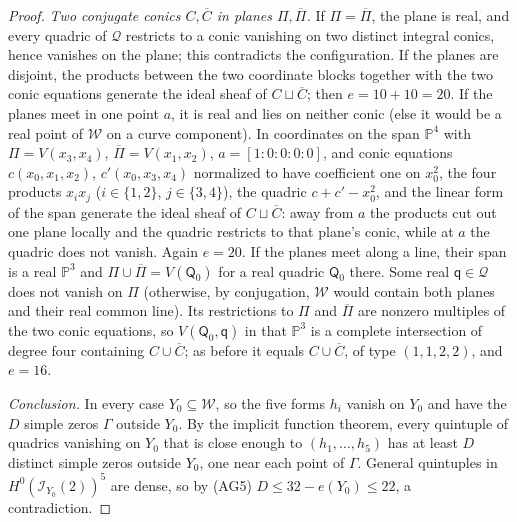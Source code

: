 \begin{proof}
\emph{Two conjugate conics $C,\overline C$ in planes $\Pi,\overline\Pi$.} If
$\Pi=\overline\Pi$, the plane is real, and every quadric of $\mathcal Q$
restricts to a conic vanishing on two distinct integral conics, hence vanishes
on the plane; this contradicts the configuration. If the planes are disjoint,
the products between the two coordinate blocks together with the two conic
equations generate the ideal sheaf of $C\sqcup\overline C$; then
$e=10+10=20$. If the planes meet in one point $a$, it is real and lies on
neither conic (else it would be a real point of $\mathcal W$ on a curve
component). In coordinates on the span $\mathbb P^4$ with $\Pi=V(x_3,x_4)$,
$\overline\Pi=V(x_1,x_2)$, $a=[1:0:0:0:0]$, and conic equations
$c(x_0,x_1,x_2)$, $c'(x_0,x_3,x_4)$ normalized to have coefficient one on
$x_0^2$, the four products $x_ix_j$ ($i\in\{1,2\}$, $j\in\{3,4\}$), the
quadric $c+c'-x_0^2$, and the linear form of the span generate the ideal sheaf
of $C\sqcup\overline C$: away from $a$ the products cut out one plane locally
and the quadric restricts to that plane's conic, while at $a$ the quadric
does not vanish. Again $e=20$. If the planes meet along a line, their span is
a real $\mathbb P^3$ and $\Pi\cup\overline\Pi=V(\mathsf Q_0)$ for a real
quadric $\mathsf Q_0$ there. Some real $\mathsf q\in\mathcal Q$ does not
vanish on $\Pi$ (otherwise, by conjugation, $\mathcal W$ would contain both
planes and their real common line). Its restrictions to $\Pi$ and
$\overline\Pi$ are nonzero multiples of the two conic equations, so
$V(\mathsf Q_0,\mathsf q)$ in that $\mathbb P^3$ is a complete intersection of
degree four containing $C\cup\overline C$; as before it equals
$C\cup\overline C$, of type $(1,1,2,2)$, and $e=16$.

\emph{Conclusion.} In every case $Y_0\subseteq\mathcal W$, so the five forms
$h_i$ vanish on $Y_0$ and have the $D$ simple zeros $\Gamma$ outside $Y_0$. By
the implicit function theorem, every quintuple of quadrics vanishing on $Y_0$
that is close enough to $(h_1,\ldots,h_5)$ has at least $D$ distinct simple
zeros outside $Y_0$, one near each point of $\Gamma$. General quintuples in
$H^0(\mathcal I_{Y_0}(2))^5$ are dense, so by (AG5) $D\le32-e(Y_0)\le22$, a
contradiction.
\end{proof}

